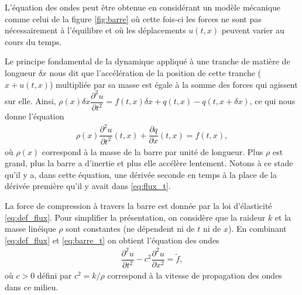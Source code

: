 \documentclass[12pt,a4paper,twoside]{article}
\begin{document}
L'\'equation des ondes peut \^etre obtenue en consid\'erant un mod\`ele m\'ecanique
comme celui de la figure \ref{fig:barre} o\`u cette fois-ci les forces ne
sont pas n\'ecessairement \`a l'\'equilibre et o\`u les d\'eplacements
$u(t,x)$ peuvent varier au cours du temps.

Le principe fondamental de la dynamique appliqu\'e \`a une tranche de mati\`ere
de longueur $\delta x$ nous dit que l'acc\'el\'eration de la position de cette tranche
($x+u(t,x)$) multipli\'ee par sa masse est \'egale \`a la somme des forces qui
agissent sur elle.
Ainsi, $\rho(x) \delta x \dfrac{\partial^2 u}{\partial t^2} = 
f(t,x) \delta x + q(t,x) - q(t, x + \delta x)$, ce qui nous donne l'\'equation
\begin{align}
  \label{eq:barre_t}
  \rho(x) \dfrac{\partial^2 u}{\partial t^2}(t,x) + \dfrac{\partial q}{\partial x}(t,x) = f(t,x) ,
\end{align}
o\`u $\rho(x)$ correspond \`a la masse de la barre par unit\'e de longueur.
Plus $\rho$ est grand, plus la barre a d'inertie et plus elle acc\'el\`ere lentement.
Notons \`a ce stade qu'il y a, dans cette \'equation, une d\'eriv\'ee seconde en temps
\`a la place de la d\'eriv\'ee premi\`ere qu'il y avait dans \eqref{eq:flux_t}.

La force de compression \`a travers la barre est donn\'ee par la loi d'\'elasticit\'e
\eqref{eq:def_flux}.
Pour simplifier la pr\'esentation, on consid\`ere que la raideur $k$ et la masse
lin\'eique $\rho$ sont constantes (ne d\'ependent ni de $t$ ni de $x$).
En combinant \eqref{eq:def_flux} et \eqref{eq:barre_t} on obtient l'\'equation des ondes
\begin{align}
  \label{eq:ondes}
  \dfrac{\partial^2 u}{\partial t^2} - c^2 \dfrac{\partial^2 u}{\partial x^2} = \widetilde{f} ,
\end{align}
o\`u $c>0$ d\'efini par $c^2 = k/\rho$ correspond \`a la vitesse de propagation
des ondes dans ce milieu.
\end{document}
